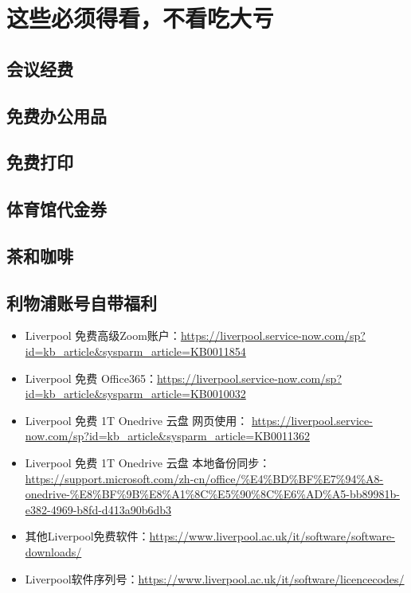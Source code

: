 
\chapter{这些必须得看，不看吃大亏}
\label{fuli}

\section{会议经费}
\section{免费办公用品}
\section{免费打印}
\section{体育馆代金券}
\section{茶和咖啡}
\section{利物浦账号自带福利}
\begin{itemize}
    \item Liverpool 免费高级Zoom账户：\url{https://liverpool.service-now.com/sp?id=kb_article&sysparm_article=KB0011854}
    \item Liverpool 免费 Office365：\url{https://liverpool.service-now.com/sp?id=kb_article&sysparm_article=KB0010032}
    \item Liverpool 免费 1T Onedrive 云盘 网页使用： \url{https://liverpool.service-now.com/sp?id=kb_article&sysparm_article=KB0011362}
    \item Liverpool 免费 1T Onedrive 云盘 本地备份同步： \url{https://support.microsoft.com/zh-cn/office/%E4%BD%BF%E7%94%A8-onedrive-%E8%BF%9B%E8%A1%8C%E5%90%8C%E6%AD%A5-bb89981b-e382-4969-b8fd-d413a90b6db3}
    \item 其他Liverpool免费软件：\url{https://www.liverpool.ac.uk/it/software/software-downloads/}
    \item Liverpool软件序列号：\url{https://www.liverpool.ac.uk/it/software/licencecodes/}
\end{itemize}


